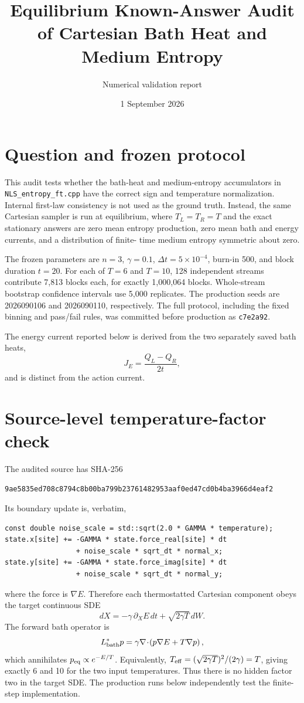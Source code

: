\documentclass[11pt]{article}
\title{Equilibrium Known-Answer Audit of Cartesian Bath Heat and Medium Entropy}
\author{Numerical validation report}
\date{1 September 2026}
\begin{document}
\maketitle

\section{Question and frozen protocol}

This audit tests whether the bath-heat and medium-entropy accumulators in
\texttt{NLS\_entropy\_ft.cpp} have the correct sign and temperature
normalization.  Internal first-law consistency is not used as the ground
truth.  Instead, the same Cartesian sampler is run at equilibrium, where
\(T_L=T_R=T\) and the exact stationary answers are zero mean entropy
production, zero mean bath and energy currents, and a distribution of finite-
time medium entropy symmetric about zero.

The frozen parameters are \(n=3\), \(\gamma=0.1\),
\(\Delta t=5\times10^{-4}\), burn-in 500, and block duration \(t=20\).
For each of \(T=6\) and \(T=10\), 128 independent streams contribute 7,813
blocks each, for exactly 1,000,064 blocks.  Whole-stream bootstrap confidence
intervals use 5,000 replicates.  The production seeds are 2026090106 and
2026090110, respectively.  The full protocol, including the fixed binning and
pass/fail rules, was committed before production as \texttt{c7e2a92}.

The energy current reported below is derived from the two separately saved
bath heats,
\[
  J_E=\frac{Q_L-Q_R}{2t},
\]
and is distinct from the action current.

\section{Source-level temperature-factor check}

The audited source has SHA-256
\begin{center}
\small\texttt{9ae5835ed708c8794c8b00ba799b23761482953aaf0ed47cd0b4ba3966d4eaf2}
\end{center}
Its boundary update is, verbatim,
\begin{verbatim}
const double noise_scale = std::sqrt(2.0 * GAMMA * temperature);
state.x[site] += -GAMMA * state.force_real[site] * dt
                 + noise_scale * sqrt_dt * normal_x;
state.y[site] += -GAMMA * state.force_imag[site] * dt
                 + noise_scale * sqrt_dt * normal_y;
\end{verbatim}
where the force is \(\nabla E\).  Therefore each thermostatted Cartesian
component obeys the target continuous SDE
\[
 dX=-\gamma\,\partial_XE\,dt+\sqrt{2\gamma T}\,dW.
\]
The forward bath operator is
\[
 L_{\rm bath}^*p=\gamma\nabla\!\cdot\!\left(p\nabla E+T\nabla p\right),
\]
which annihilates \(p_{\rm eq}\propto e^{-E/T}\).  Equivalently,
\(T_{\rm eff}=(\sqrt{2\gamma T})^2/(2\gamma)=T\), giving exactly 6 and 10
for the two input temperatures.  Thus there is no hidden factor two in the
target SDE.  The production runs below independently test the finite-step
implementation.
\end{document}
